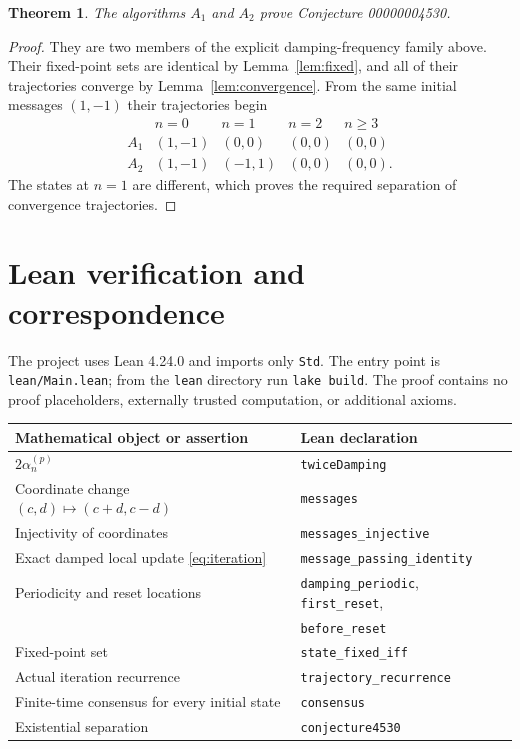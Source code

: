 \documentclass[11pt]{article}
\newtheorem{theorem}{Theorem}
\begin{document}
\begin{theorem}
The algorithms $A_1$ and $A_2$ prove Conjecture 00000004530.
\end{theorem}
\begin{proof}
They are two members of the explicit damping-frequency family above.
Their fixed-point sets are identical by Lemma~\ref{lem:fixed}, and all
of their trajectories converge by Lemma~\ref{lem:convergence}.
From the same initial messages $(1,-1)$ their trajectories begin
\[
\begin{array}{c|cccc}
 &n=0&n=1&n=2&n\geq3\\\hline
 A_1&(1,-1)&(0,0)&(0,0)&(0,0)\\
 A_2&(1,-1)&(-1,1)&(0,0)&(0,0).
\end{array}
\]
The states at $n=1$ are different, which proves the required separation
of convergence trajectories.
\end{proof}

\section{Lean verification and correspondence}
The project uses Lean 4.24.0 and imports only \texttt{Std}. The entry point
is \texttt{lean/Main.lean}; from the \texttt{lean} directory run
\texttt{lake build}. The proof contains no proof placeholders, externally
trusted computation, or additional axioms.

\begin{center}
\begin{tabular}{ll}
Mathematical object or assertion & Lean declaration\\\hline
$2\alpha^{(p)}_n$ & \texttt{twiceDamping}\\
Coordinate change $(c,d)\mapsto(c+d,c-d)$ & \texttt{messages}\\
Injectivity of coordinates & \texttt{messages\_injective}\\
Exact damped local update \eqref{eq:iteration} & \texttt{message\_passing\_identity}\\
Periodicity and reset locations & \texttt{damping\_periodic}, \texttt{first\_reset},\\
 & \texttt{before\_reset}\\
Fixed-point set & \texttt{state\_fixed\_iff}\\
Actual iteration recurrence & \texttt{trajectory\_recurrence}\\
Finite-time consensus for every initial state & \texttt{consensus}\\
Existential separation & \texttt{conjecture4530}
\end{tabular}
\end{center}
\end{document}
